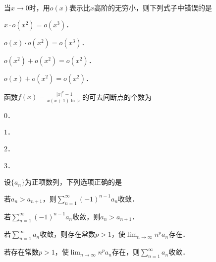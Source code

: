 \documentclass[plain,noanswer,medmath]{../../template/jnuexam}
\begin{document}






\begin{problem}
当$x \to 0$时，用$o(x)$表示比$x$高阶的无穷小，则下列式子中错误的是\pickout{}
\begin{abcd}
\item $x \cdot o(x^2) = o(x^3)$．
\item $o(x) \cdot o(x^2) = o(x^3)$．
\item $o(x^2) + o(x^2) = o(x^2)$．
\item $o(x) + o(x^2) = o(x^2)$．
\end{abcd}
\end{problem}


\begin{problem}
函数$f(x) = \frac{|x|^x - 1}{x(x + 1)\ln |x|}$的可去间断点的个数为\pickout{}
\begin{abcd}
\item $0$．
\item $1$．
\item $2$．
\item $3$．
\end{abcd}
\end{problem}




\begin{problem}
设$\{a_n\}$为正项数列，下列选项正确的是\pickout{}
\begin{abcd}
\item 若$a_n > a_{n + 1}$，则$\sum_{n = 1}^{\infty}(- 1)^{n - 1}a_n$收敛．
\item 若$\sum_{n = 1}^{\infty}(- 1)^{n - 1}a_n$收敛，则$a_n > a_{n + 1}$．
\item 若$\sum_{n = 1}^{\infty}a_n$收敛，则存在常数$p > 1$，使$\lim_{n \to \infty} n^p a_n$存在．
\item 若存在常数$p > 1$，使$\lim_{n \to \infty} n^p a_n$存在，则$\sum_{n = 1}^{\infty}a_n$收敛．
\end{abcd}
\end{problem}






\end{document}

